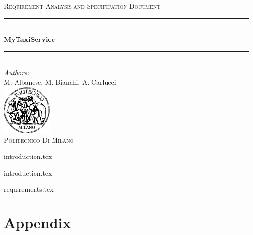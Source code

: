 \documentclass[a4paper,12pt]{article}
\begin{document}
\begin{titlepage}
\begin{center}
\textsc{\LARGE Requirement Analysis and Specification Document}\\[1.5cm] %

\rule{\linewidth}{0.5mm} \\[0.7cm]
{\huge \bfseries MyTaxiService}\\[0.4cm] %
\rule{\linewidth}{0.5mm} \\[1.5cm]
 
\emph{Authors:}\\
M. Albanese, M. Bianchi, A. Carlucci\\[2.0cm] 

\vfill
\vfill
\includegraphics[width=25mm]{polimi.png}\\
\textsc{Politecnico Di Milano}
\end{center}
\end{titlepage}

\tableofcontents
\pagebreak

{introduction.tex}

{introduction.tex}

{requirements.tex}

\section{Appendix}


\end{document}
